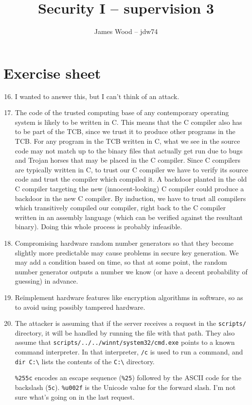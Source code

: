 \documentclass{article}
\begin{document}
\title{Security I -- supervision 3}
\author{James Wood -- jdw74}
\maketitle

\section*{Exercise sheet}
\begin{enumerate}
    \setcounter{enumi}{15}
  \item I wanted to answer this, but I can't think of an attack.
    \setcounter{enumi}{19}
  \item The code of the trusted computing base of any contemporary operating system is likely to be written in C. This means that the C compiler also has to be part of the TCB, since we trust it to produce other programs in the TCB. For any program in the TCB written in C, what we see in the source code may not match up to the binary files that actually get run due to bugs and Trojan horses that may be placed in the C compiler. Since C compilers are typically written in C, to trust our C compiler we have to verify its source code and trust the compiler which compiled it. A backdoor planted in the old C compiler targeting the new (innocent-looking) C compiler could produce a backdoor in the new C compiler. By induction, we have to trust all compilers which transitively compiled our compiler, right back to the C compiler written in an assembly language (which can be verified against the resultant binary). Doing this whole process is probably infeasible.
  \item Compromising hardware random number generators so that they become slightly more predictable may cause problems in secure key generation. We may add a condition based on time, so that at some point, the random number generator outputs a number we know (or have a decent probability of guessing) in advance.
  \item Re\"implement hardware features like encryption algorithms in software, so as to avoid using possibly tampered hardware.
    \setcounter{enumi}{31}
  \item
    The attacker is assuming that if the server receives a request in the \texttt{scripts/} directory, it will be handled by running the file with that path. They also assume that \texttt{scripts/../../winnt/system32/cmd.exe} points to a known command interpreter. In that interpreter, \texttt{/c} is used to run a command, and \texttt{dir C:\textbackslash} lists the contents of the \texttt{C:\textbackslash} directory.

    \texttt{\%255c} encodes an escape sequence (\texttt{\%25}) followed by the ASCII code for the backslash (\texttt{5c}). \texttt{\%u002f} is the Unicode value for the forward slash. I'm not sure what's going on in the last request.
\end{enumerate}
\end{document}
